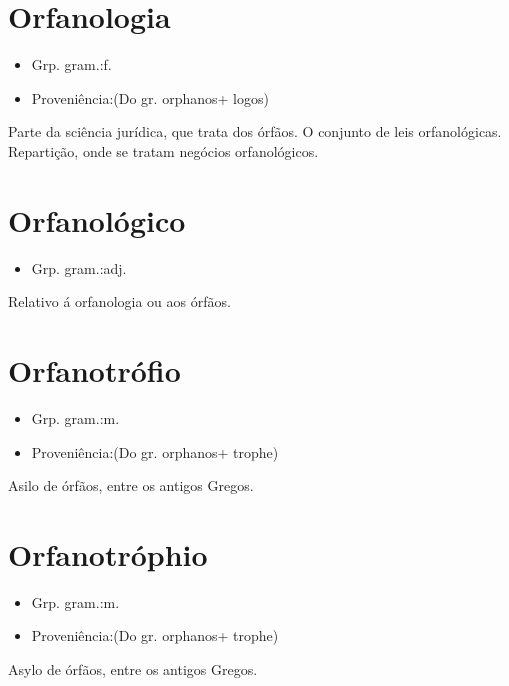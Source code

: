 \section{Orfanologia}
\begin{itemize}
\item {Grp. gram.:f.}
\end{itemize}
\begin{itemize}
\item {Proveniência:(Do gr. \textunderscore orphanos\textunderscore  + \textunderscore logos\textunderscore )}
\end{itemize}
Parte da sciência jurídica, que trata dos órfãos.
O conjunto de leis orfanológicas.
Repartição, onde se tratam negócios orfanológicos.
\section{Orfanológico}
\begin{itemize}
\item {Grp. gram.:adj.}
\end{itemize}
Relativo á orfanologia ou aos órfãos.
\section{Orfanotrófio}
\begin{itemize}
\item {Grp. gram.:m.}
\end{itemize}
\begin{itemize}
\item {Proveniência:(Do gr. \textunderscore orphanos\textunderscore  + \textunderscore trophe\textunderscore )}
\end{itemize}
Asilo de órfãos, entre os antigos Gregos.
\section{Orfanotróphio}
\begin{itemize}
\item {Grp. gram.:m.}
\end{itemize}
\begin{itemize}
\item {Proveniência:(Do gr. \textunderscore orphanos\textunderscore  + \textunderscore trophe\textunderscore )}
\end{itemize}
Asylo de órfãos, entre os antigos Gregos.
